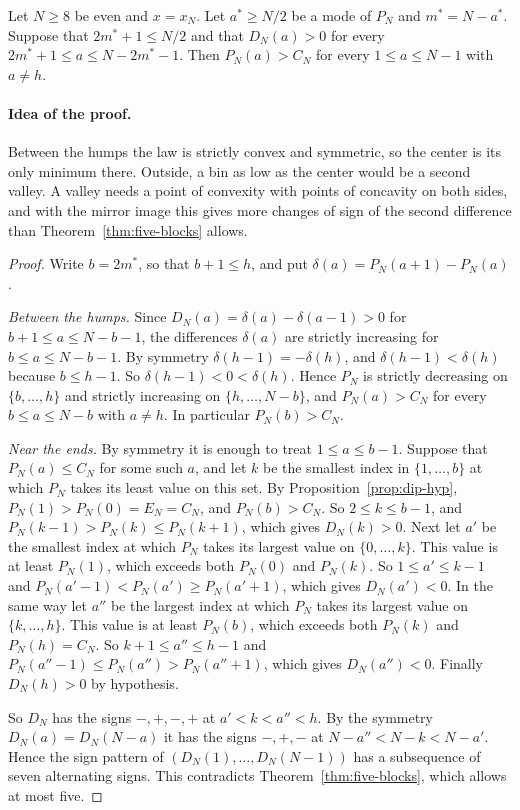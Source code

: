 
\begin{lemma}\label{lem:center-convex}
Let $N\ge8$ be even and $x=x_N$. Let $a^*\ge N/2$ be a mode of $P_N$ and $m^*=N-a^*$.
Suppose that $2m^*+1\le N/2$ and that $D_N(a)>0$ for every $2m^*+1\le a\le N-2m^*-1$. Then
$P_N(a)>C_N$ for every $1\le a\le N-1$ with $a\ne h$.
\end{lemma}

\paragraph{Idea of the proof.}
Between the humps the law is strictly convex and symmetric, so the center is its only minimum
there. Outside, a bin as low as the center would be a second valley. A valley needs a point of
convexity with points of concavity on both sides, and with the mirror image this gives more
changes of sign of the second difference than Theorem~\ref{thm:five-blocks} allows.

\begin{proof}
Write $b=2m^*$, so that $b+1\le h$, and put $\delta(a)=P_N(a+1)-P_N(a)$.

\emph{Between the humps.} Since $D_N(a)=\delta(a)-\delta(a-1)>0$ for $b+1\le a\le N-b-1$, the
differences $\delta(a)$ are strictly increasing for $b\le a\le N-b-1$. By symmetry
$\delta(h-1)=-\delta(h)$, and $\delta(h-1)<\delta(h)$ because $b\le h-1$. So
$\delta(h-1)<0<\delta(h)$. Hence $P_N$ is strictly decreasing on $\{b,\dots,h\}$ and strictly
increasing on $\{h,\dots,N-b\}$, and $P_N(a)>C_N$ for every $b\le a\le N-b$ with $a\ne h$. In
particular $P_N(b)>C_N$.

\emph{Near the ends.} By symmetry it is enough to treat $1\le a\le b-1$. Suppose that
$P_N(a)\le C_N$ for some such $a$, and let $k$ be the smallest index in $\{1,\dots,b\}$ at which
$P_N$ takes its least value on this set. By Proposition~\ref{prop:dip-hyp},
$P_N(1)>P_N(0)=E_N=C_N$, and $P_N(b)>C_N$. So $2\le k\le b-1$, and
$P_N(k-1)>P_N(k)\le P_N(k+1)$, which gives $D_N(k)>0$.
Next let $a'$ be the smallest index at which $P_N$ takes its largest value on $\{0,\dots,k\}$.
This value is at least $P_N(1)$, which exceeds both $P_N(0)$ and $P_N(k)$. So $1\le a'\le k-1$
and $P_N(a'-1)<P_N(a')\ge P_N(a'+1)$, which gives $D_N(a')<0$. In the same way let $a''$ be the
largest index at which $P_N$ takes its largest value on $\{k,\dots,h\}$. This value is at least
$P_N(b)$, which exceeds both $P_N(k)$ and $P_N(h)=C_N$. So $k+1\le a''\le h-1$ and
$P_N(a''-1)\le P_N(a'')>P_N(a''+1)$, which gives $D_N(a'')<0$. Finally $D_N(h)>0$ by hypothesis.

So $D_N$ has the signs $-,+,-,+$ at $a'<k<a''<h$. By the symmetry $D_N(a)=D_N(N-a)$ it has the
signs $-,+,-$ at $N-a''<N-k<N-a'$. Hence the sign pattern of $(D_N(1),\dots,D_N(N-1))$ has a
subsequence of seven alternating signs. This contradicts Theorem~\ref{thm:five-blocks}, which
allows at most five.
\end{proof}

